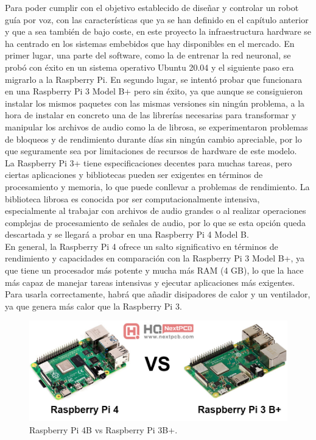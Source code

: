 Para poder cumplir con el objetivo establecido de diseñar y controlar un robot guía por voz, con las características que ya se han definido en el capítulo anterior y que a sea también de bajo coste, en este proyecto la infraestructura hardware se ha centrado en los sistemas embebidos que hay disponibles en el mercado. En primer lugar, una parte del software, como la de entrenar la red neuronal, se probó con éxito en un sistema operativo Ubuntu 20.04 y el siguiente paso era migrarlo a la Raspberry Pi. En segundo lugar, se intentó probar que funcionara en una Raspberry Pi 3 Model B+ pero sin éxito, ya que aunque se consiguieron instalar los mismos paquetes con las mismas versiones sin ningún problema, a la hora de instalar en concreto una de las librerías necesarias para transformar y manipular los archivos de audio como la de librosa, se experimentaron problemas de bloqueos y de rendimiento durante días sin ningún cambio apreciable, por lo que seguramente sea por limitaciones de recursos de hardware de este modelo.\\

La Raspberry Pi 3+ tiene especificaciones decentes para muchas tareas, pero ciertas aplicaciones y bibliotecas pueden ser exigentes en términos de procesamiento y memoria, lo que puede conllevar a problemas de rendimiento. La biblioteca librosa es conocida por ser computacionalmente intensiva, especialmente al trabajar con archivos de audio grandes o al realizar operaciones complejas de procesamiento de señales de audio, por lo que se esta opción queda descartada y se llegará a probar en una Raspberry Pi 4 Model B.\\

En general, la Raspberry Pi 4 ofrece un salto significativo en términos de rendimiento y capacidades en comparación con la Raspberry Pi 3 Model B+, ya que tiene un procesador más potente y mucha más RAM (4 GB), lo que la hace más capaz de manejar tareas intensivas y ejecutar aplicaciones más exigentes. Para usarla correctamente, habrá que añadir disipadores de calor y un ventilador, ya que genera más calor que la Raspberry Pi 3.



\begin{figure}[H]
  \centering
  \includegraphics[scale=0.4]{figs/rasps} %
  \caption{Raspberry Pi 4B vs Raspberry Pi 3B+.}
  \label{fig:Raspberry}
\end{figure}


